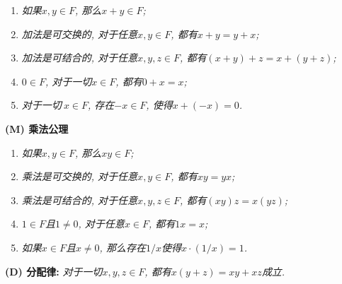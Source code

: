\documentclass[cn,12pt,math=mtpro2,citestyle=gb7714-2015,bibstyle=gb7714-2015,twocol]{elegantbook}
\begin{document}
\begin{enumerate}[label=(A\arabic*)]
\item \emph{如果$x, y\in F$, 那么$x+y\in F$;}
\item \emph{加法是可交换的, 对于任意$x, y \in F$, 都有$x+y=y+x$;}
\item \emph{加法是可结合的, 对于任意$ x, y, z \in F$, 都有$ (x+y)+z=x+(y+z)$;}
\item \emph{$0 \in F$, 对于一切$ x \in F$, 都有$0+x=x$;}
\item \emph{对于一切$\ x \in F$, 存在$ -x \in F$, 使得$x+(-x)=0$.}
\end{enumerate}

\textbf{(M) 乘法公理}

\begin{enumerate}[label=(M\arabic*)]
\item \emph{如果$x, y \in F$, 那么$xy \in F$;}
\item \emph{乘法是可交换的, 对于任意$ x, y \in F$, 都有$xy=yx$;}
\item \emph{乘法是可结合的, 对于任意$x, y, z \in F$, 都有$ (xy)z=x(yz)$;}
\item \emph{$1\in F$且$1\neq 0$, 对于任意$ x \in F$, 都有$1x=x$;}
\item \emph{如果$x \in F$且$x\neq 0$, 那么存在$ 1/x$使得$x\cdot (1/x)=1$.}
\end{enumerate}

\textbf{(D) 分配律:} \emph{ 对于一切$x, y, z \in F$, 都有$x(y+z)=xy+xz$成立.}
\end{document}

